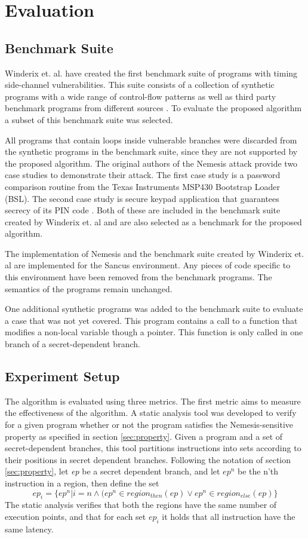 
\chapter{Evaluation}
\section{Benchmark Suite}
Winderix et. al. have created the first benchmark suite of programs with timing side-channel vulnerabilities. This suite consists of a 
collection of synthetic programs with a wide range of control-flow patterns as well as third party benchmark programs from different sources \cite{WinderixHans}. 
To evaluate the proposed algorithm a subset of this benchmark suite was selected. 

All programs that contain loops inside vulnerable branches were discarded from the synthetic programs in the benchmark suite, 
since they are not supported by the proposed algorithm. 
The original authors of the Nemesis attack provide two case studies to demonstrate their attack. 
The first case study is a password comparison routine from the Texas Instruments MSP430 Bootstrap Loader (BSL). 
The second case study is secure keypad application that guarantees secrecy of its PIN code \cite{Nemesis}.
Both of these are included in the benchmark suite created by Winderix et. al and are also selected as a benchmark for the proposed algorithm. 

The implementation of Nemesis and the benchmark suite created by Winderix et. al are implemented for the Sancus environment. Any pieces of code specific to this
environment have been removed from the benchmark programs. The semantics of the programs remain unchanged. 

One additional synthetic programs was added to the benchmark suite to evaluate a case that was not yet covered. This program contains a call to a function that 
modifies a non-local variable though a pointer. This function is only called in one branch of a secret-dependent branch. 

\section{Experiment Setup}
The algorithm is evaluated using three metrics. The first metric aims to measure the effectiveness of the algorithm. A static analysis tool was developed to verify 
for a given program whether or not the program satisfies the Nemesis-sensitive property as specified in section \ref{sec:property}.
Given a program and a set of secret-dependent branches, this tool partitions instructions into sets according to their positions in secret dependent branches. Following the notation of section \ref{sec:property}, let \textit{ep} be a secret dependent branch, and let $ep^n$ be the n'th instruction in a region, then define the set 
\begin{equation} \label{eq:toolSets}
    ep_i = \{ ep^n |i = n \land  (ep^n \in region_{then}(ep) \lor ep^n \in region_{else}(ep)\}
\end{equation}
The static analysis verifies that both the regions have the same number of execution points, and that for each set $ep_i$ it holds that all 
instruction have the same latency.

